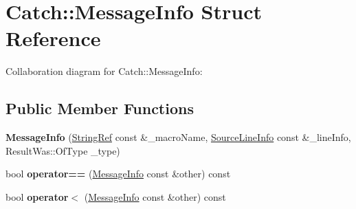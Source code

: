 \hypertarget{structCatch_1_1MessageInfo}{}\section{Catch\+:\+:Message\+Info Struct Reference}
\label{structCatch_1_1MessageInfo}


Collaboration diagram for Catch\+:\+:Message\+Info\+:
\subsection*{Public Member Functions}
\begin{DoxyCompactItemize}
\item 
\mbox{\label{structCatch_1_1MessageInfo_afac7a84a9e8655428035a3c5418044f0}} 
{\bfseries Message\+Info} (\hyperlink{classCatch_1_1StringRef}{String\+Ref} const \&\+\_\+macro\+Name, \hyperlink{structCatch_1_1SourceLineInfo}{Source\+Line\+Info} const \&\+\_\+line\+Info, Result\+Was\+::\+Of\+Type \+\_\+type)
\item 
\mbox{\label{structCatch_1_1MessageInfo_af4b37f2172ba55395813b4bb6bbbde1a}} 
bool {\bfseries operator==} (\hyperlink{structCatch_1_1MessageInfo}{Message\+Info} const \&other) const
\item 
\mbox{\label{structCatch_1_1MessageInfo_a8254cb8fca2da02a29a9843cdcb79df1}} 
bool {\bfseries operator$<$} (\hyperlink{structCatch_1_1MessageInfo}{Message\+Info} const \&other) const
\end{DoxyCompactItemize}
